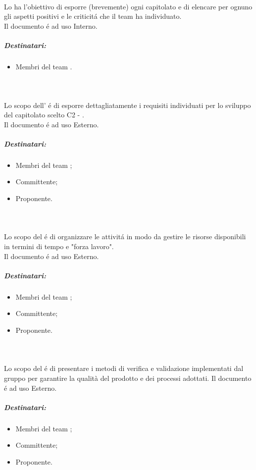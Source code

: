       \paragraph{\SdF\\}
      Lo \textit{\SdF{}} ha l'obiettivo di esporre (brevemente) ogni capitolato e di elencare per ognuno gli aspetti positivi e le criticitá che il team ha individuato.\\
      Il documento é ad uso Interno.
      \subparagraph*{Destinatari:}
      \begin{itemize}
        \item Membri del team \Gruppo{}.
      \end{itemize}

      \paragraph{\AdR\\}
      Lo  scopo  dell' \textit{\AdR{}} é di esporre dettagliatamente i requisiti individuati per lo sviluppo del capitolato scelto C2 - \NomeProgetto{}.\\
      Il documento é ad uso Esterno.
      \subparagraph*{Destinatari:}
      \begin{itemize}
        \item Membri del team \Gruppo{};
        \item Committente;
        \item Proponente.
      \end{itemize}

      \paragraph{\PdP\\}
      Lo scopo del \textit{\PdP{}} é di organizzare le attivitá in modo da gestire le risorse disponibili in termini di tempo e "forza lavoro".\\
      Il documento é ad uso Esterno.
      \subparagraph*{Destinatari:}
      \begin{itemize}
        \item Membri del team \Gruppo{};
        \item Committente;
        \item Proponente.
      \end{itemize}

      \paragraph{\PdQ\\}
      Lo scopo del \textit{\PdQ{}} é di presentare i metodi di verifica e validazione implementati dal gruppo per garantire la qualità del prodotto e dei processi adottati.
      Il documento é ad uso Esterno.
      \subparagraph*{Destinatari:}
      \begin{itemize}
        \item Membri del team \Gruppo{};
        \item Committente;
        \item Proponente.
      \end{itemize}


